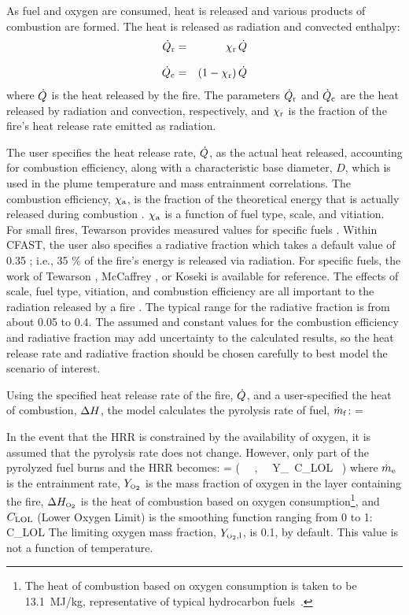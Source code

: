 \documentclass[12pt]{book}
\begin{document}
As fuel and oxygen are consumed, heat is released and various products of combustion are formed. The heat is released as radiation and convected enthalpy:
\begin{eqnarray}
   \dot{Q}_{\rm r} &=& \chi_{\rm r} \, \dot{Q} \\[.1in]
   \dot{Q}_{\rm c} &=& (1-\chi_{\rm r}) \, \dot{Q} \\
\end{eqnarray}
where $\dot{Q}$ is the heat released by the fire. The parameters $\dot{Q}_{\rm r}$ and $\dot{Q}_{\rm c}$ are the heat released by radiation and convection, respectively, and $\chi_{\rm r}$ is the fraction of the fire's heat release rate emitted as radiation.

The user specifies the heat release rate, $\dot{Q}$, as the actual heat released, accounting for combustion efficiency, along with a characteristic base diameter, $D$, which is used in the plume temperature and mass entrainment correlations. The combustion efficiency, $\chi_{\rm a}$, is the fraction of the theoretical energy that is actually released during combustion \cite{Hamins:1996}. $\chi_{\rm a}$ is a function of fuel type, scale, and vitiation. For small fires, Tewarson provides measured values for specific fuels \cite{Tewarson:2003}. Within CFAST, the user also specifies a radiative fraction which takes a default value of 0.35 ; i.e., 35 \% of the fire's energy is released via radiation.  For specific fuels, the work of Tewarson \cite{Tewarson:2003}, McCaffrey \cite{McCaffrey:1982}, or Koseki \cite{Koseki:1989} is available for reference. The effects of scale, fuel type, vitiation, and combustion efficiency are all important to the radiation released by a fire \cite{Hamins:1991, Hamins:1994}. The typical range for the radiative fraction is from about 0.05 to 0.4. The assumed and constant values for the combustion efficiency and radiative fraction may add uncertainty to the calculated results, so the heat release rate and radiative fraction should be chosen carefully to best model the scenario of interest.

Using the specified heat release rate of the fire, $\dot{Q}$, and a user-specified the heat of combustion, $\Delta H$,  the model calculates the pyrolysis rate of fuel, $\dot{m}_{\rm f}$:
\be
   \dmf = \frac{\dQ}{\Dh}
\ee

In the event that the HRR is constrained by the availability of oxygen, it is assumed that the pyrolysis rate does not change. However, only part of the pyrolyzed fuel burns and the HRR becomes:
\be
   \dQ = \min \Big( \dmf \, \Dh \, , \, \dme \, Y_\OTWO \, C_{\rm LOL} \, \DhO \Big)
\ee
where $\dot{m}_{\rm e}$ is the entrainment rate, $Y_{\tiny \hbox{O}_2}$ is the mass fraction of oxygen in the layer containing the fire, $\Delta H_{\tiny \hbox{O}_2}$ is the heat of combustion based on oxygen consumption\footnote{The heat of combustion based on oxygen consumption is taken to be 13.1~MJ/kg, representative of typical hydrocarbon fuels~\cite{Huggett:1980}.}, and $C_{\rm LOL}$ (Lower Oxygen Limit) is the smoothing function ranging from 0 to 1:
\be
   C_{\rm LOL} \approx {}
\ee
The limiting oxygen mass fraction, $Y_{{\tiny \hbox{O}_2},{\rm l}}$, is 0.1, by default. This value is not a function of temperature.
\end{document}
